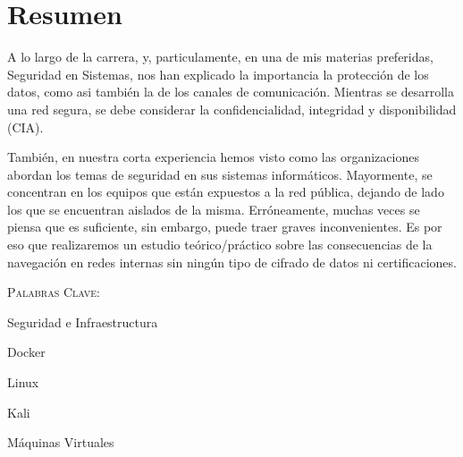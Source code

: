 \thispagestyle{empty}
\chapter*{Resumen}


\bigskip
A lo largo de la carrera, y, particulamente, en una de mis materias preferidas, 
Seguridad en Sistemas, nos han explicado la importancia la protección de los 
datos, como asi también la de los canales de comunicación. Mientras se desarrolla 
una red segura, se debe considerar la confidencialidad, integridad y disponibilidad 
(CIA). 

También, en nuestra corta experiencia hemos visto como las organizaciones 
abordan los temas de seguridad en sus sistemas informáticos. Mayormente, se 
concentran en los equipos que están expuestos a la red pública, dejando de 
lado los que se encuentran aislados de la misma. Erróneamente, muchas veces 
se piensa que es suficiente, sin embargo, puede traer graves inconvenientes. 
Es por eso que realizaremos un estudio teórico/práctico sobre las consecuencias 
de la navegación en redes internas sin ningún tipo de cifrado de datos ni 
certificaciones.

\bigskip
\noindent \textsc{Palabras Clave:} \par

Seguridad e Infraestructura\par
Docker \par
Linux \par
Kali \par
Máquinas Virtuales  \par



